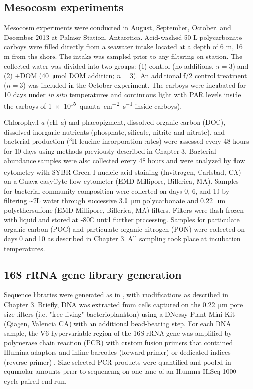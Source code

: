  

\subsection{Mesocosm experiments}

Mesocosm experiments were conducted in August, September, October, and December 2013 at Palmer Station, Antarctica. Acid-washed 50 L polycarbonate carboys were filled directly from a seawater intake located at a depth of 6 m, 16 m from the shore. The intake was sampled prior to any filtering on station. The collected water was divided into two groups: (1) control (no additions, $n=3$) and (2) +DOM (\SI{40}{\micro\mole} DOM addition; $n=3$). An additional f/2 control treatment ($n=3$) was included in the October experiment. The carboys were incubated for 10 days under \emph{in situ} temperatures and continuous light with PAR levels inside the carboys of \SI{1e15}{quanta~\cm^{-2}~\second^{-1}} inside carboys).

Chlorophyll \emph{a} (chl \emph{a}) and phaeopigment, dissolved organic carbon (DOC), dissolved inorganic nutrients (phosphate, silicate, nitrite and nitrate), and bacterial production ($^{3}$H-leucine incorporation rates) were assessed every 48 hours for 10 days using methods previously described in Chapter 3. Bacterial abundance samples were also collected every 48 hours and were analyzed by flow cytometry with SYBR \textsuperscript{\textregistered} Green I nucleic acid staining (Invitrogen, Carlsbad, CA) on a Guava easyCyte flow cytometer (EMD Millipore, Billerica, MA). Samples for bacterial community composition were collected on days 0, 6, and 10 by filtering \textasciitilde{}2L water through successive \SI{3.0}{\micro\meter} polycarbonate and \SI{0.22}{\micro\meter} polyethersulfone (EMD Millipore, Billerica, MA) filters. Filters were flash-frozen with liquid  and stored at -80\textdegree C until further processing. Samples for particulate organic carbon (POC) and particulate organic nitrogen (PON) were collected on days 0 and 10 as described in Chapter 3. All sampling took place at incubation temperatures. 

 

\subsection{16S rRNA gene library generation} 

Sequence libraries were generated as in \citet{Eren2013-ob}, with modifications as described in Chapter 3. Briefly, DNA was extracted from cells captured on the \SI{0.22}{\micro\meter} pore size filters (i.e. "free-living" bacterioplankton) using a DNeasy Plant Mini Kit (Qiagen, Valencia CA) with an additional bead-beating step. For each DNA sample, the V6 hypervariable region of the 16S rRNA gene was amplified by polymerase chain reaction (PCR) with custom fusion primers that contained Illumina adaptors and inline barcodes (forward primer) or dedicated indices (reverse primer) \citep{Eren2013-ob}. Size-selected PCR products were quantified and pooled in equimolar amounts prior to sequencing on one lane of an Illumina HiSeq 1000 cycle paired-end run. 

